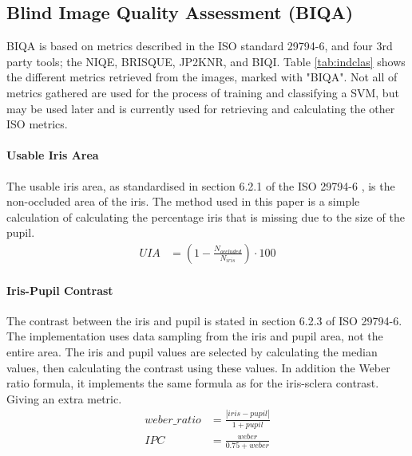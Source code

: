 
\subsection{Blind Image Quality Assessment (BIQA)}\label{sec:biqa}
\vspace{-3mm}
BIQA is based on metrics described in the ISO standard 29794-6\cite{iso},
and four 3rd party tools; the NIQE\cite{niqe}, BRISQUE\cite{brisque},
JP2KNR\cite{jp2knr}, and BIQI\cite{biqi}.
Table \ref{tab:indclas} shows the different metrics retrieved from
the images, marked with "BIQA". Not all of metrics gathered are used for the process of training and
classifying a SVM, but may be used later and is currently used for retrieving 
and calculating the other ISO metrics.



\paragraph{Usable Iris Area}
The usable iris area, as standardised in section 6.2.1 of the ISO 29794-6
\cite{iso}, is the non-occluded area of the iris.
The method used in this paper is a simple calculation of calculating the
percentage iris that is missing due to the size of the pupil.
\vspace{-3mm}
\begin{align}
	UIA &= (1-\frac{N_{occluded}}{N_{iris}} ) \cdot 100
\end{align}



\paragraph{Iris-Pupil Contrast}
The contrast between the iris and pupil is stated in section 6.2.3 of ISO
29794-6\cite{iso}. 
The implementation uses data sampling from the iris and pupil 
area, not the entire area.  The iris and pupil values are selected by
calculating the median values, then calculating the contrast using these values.
In addition the Weber ratio formula, it implements the same formula as for the 
iris-sclera contrast. Giving an extra metric.
\vspace{-3mm}
\begin{align}
	weber\_ratio &= \frac{|iris - pupil|}{1 + pupil}	\\
	IPC &= \frac{weber}{0.75 + weber}
\end{align}



